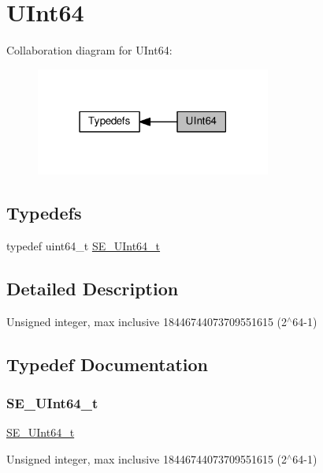 \hypertarget{group__UInt64}{}\section{U\+Int64}
\label{group__UInt64}
Collaboration diagram for U\+Int64\+:\nopagebreak
\begin{figure}[H]
\begin{center}
\leavevmode
\includegraphics[width=219pt]{group__UInt64}
\end{center}
\end{figure}
\subsection*{Typedefs}
\begin{DoxyCompactItemize}
\item 
typedef uint64\+\_\+t \hyperlink{group__UInt64_ga50a8edb1db077d1baf1036a6e3cd212a}{S\+E\+\_\+\+U\+Int64\+\_\+t}
\end{DoxyCompactItemize}


\subsection{Detailed Description}
Unsigned integer, max inclusive 18446744073709551615 (2$^\wedge$64-\/1) 

\subsection{Typedef Documentation}
\mbox{\label{group__UInt64_ga50a8edb1db077d1baf1036a6e3cd212a}} 
\subsubsection{\texorpdfstring{S\+E\+\_\+\+U\+Int64\+\_\+t}{SE\_UInt64\_t}}
{\footnotesize\ttfamily \hyperlink{group__UInt64_ga50a8edb1db077d1baf1036a6e3cd212a}{S\+E\+\_\+\+U\+Int64\+\_\+t}}

Unsigned integer, max inclusive 18446744073709551615 (2$^\wedge$64-\/1) 